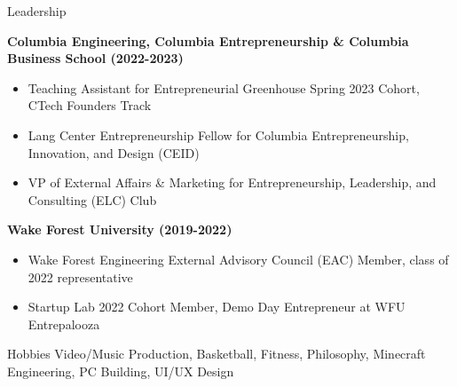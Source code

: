 \documentclass{resume} %
\begin{document}
\begin{rSection}{Leadership} 

\textbf{Columbia Engineering, Columbia Entrepreneurship \& Columbia Business School (2022-2023)}
 \begin{itemize}
    \itemsep -2pt {}
     \item Teaching Assistant for Entrepreneurial Greenhouse Spring 2023 Cohort, CTech Founders Track
     \item Lang Center Entrepreneurship Fellow for Columbia Entrepreneurship, Innovation, and Design (CEID)
     \item VP of External Affairs \& Marketing for Entrepreneurship, Leadership, and Consulting (ELC) Club
 \end{itemize}

\textbf{Wake Forest University (2019-2022)}
 \begin{itemize}
    \itemsep -2pt {}
    \item Wake Forest Engineering External Advisory Council (EAC) Member, class of 2022 representative
    \item Startup Lab 2022 Cohort Member, Demo Day Entrepreneur at WFU Entrepalooza 
 \end{itemize}

\end{rSection}

\begin{rSection}{Hobbies} 
Video/Music Production, Basketball, Fitness, Philosophy, Minecraft Engineering, PC Building, UI/UX Design


\end{rSection}
\end{document}
